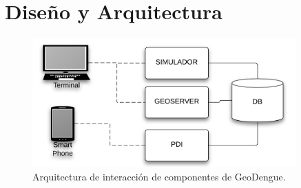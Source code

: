 \section{Diseño y Arquitectura}

\begin{figure}
\centering
\includegraphics[width=0.9\textwidth]{capitulo-5/graphics/arquitectura-completa.png}
\caption{\label{fig:arquitectura-completa}Arquitectura de interacción de componentes de GeoDengue.}
\end{figure}
